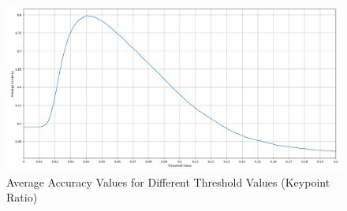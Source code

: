 \begin{figure}[h]
    \centering
    \includegraphics[scale=0.21]{images/threshold_adjusting.png}
    \caption{Average Accuracy Values for Different Threshold Values (Keypoint Ratio)}
    \label{fig:threshold_new}
  \end{figure}

